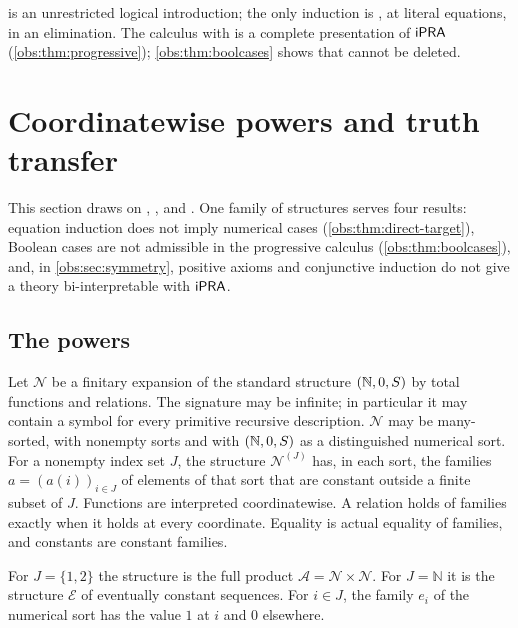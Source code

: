  is an unrestricted logical introduction; the only induction is
, at literal equations, in an elimination. The calculus with
 is a complete presentation of $\mathsf{iPRA}$
(\cref{obs:thm:progressive}); \cref{obs:thm:boolcases} shows that
 cannot be deleted.

\section{Coordinatewise powers and truth transfer}
\label{obs:sec:powers}

This section draws on , ,
 and . One family of structures
serves four results: equation induction does not imply numerical cases
(\cref{obs:thm:direct-target}), Boolean cases are not admissible in the
progressive calculus (\cref{obs:thm:boolcases}), and, in
\cref{obs:sec:symmetry}, positive axioms and conjunctive induction do not give
a theory bi-interpretable with $\mathsf{iPRA}$.

\subsection{The powers}

\begin{definition}
\label{obs:def:power}
Let $\mathcal{N}$ be a finitary expansion of the standard structure
$(\mathbb{N},0,S)$ by total functions and relations. The signature may be
infinite; in particular it may contain a symbol for every primitive recursive
description. $\mathcal{N}$ may be many-sorted, with nonempty sorts and with
$(\mathbb{N},0,S)$ as a distinguished numerical sort. For a nonempty index
set $J$, the structure $\mathcal{N}^{(J)}$ has, in each sort, the families
$a=(a(i))_{i\in J}$ of elements of that sort that are constant outside a finite
subset of $J$. Functions are interpreted coordinatewise. A relation holds of
families exactly when it holds at every coordinate. Equality is actual equality
of families, and constants are constant families.

For $J=\{1,2\}$ the structure is the full product
$\mathcal{A}=\mathcal{N}\times\mathcal{N}$. For $J=\mathbb{N}$ it is the
structure $\mathcal{E}$ of eventually constant sequences. For $i\in J$, the
family $e_i$ of the numerical sort has the value $1$ at $i$ and $0$ elsewhere.
\end{definition}

